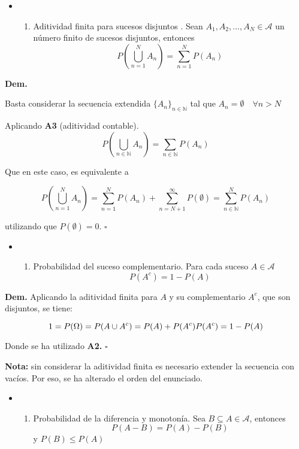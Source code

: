 \begin{itemize}
\item
  \begin{enumerate}
  \def\labelenumi{\alph{enumi})}
  \setcounter{enumi}{1}
  \tightlist
  \item
    Aditividad finita para sucesos disjuntos . Sean
    \(A_1, A_2, \dots, A_N \in \mathcal{A}\) un número finito de sucesos
    disjuntos, entonces \[
    P\left(\bigcup_{n=1}^N A_n \right) = \sum_{n=1}^N P(A_n)
    \]
  \end{enumerate}
\end{itemize}

\textbf{Dem.}

Basta considerar la secuencia extendida \(\{A_n\}_{n \in \mathbb{N}}\)
tal que \(A_n = \emptyset \quad \forall n > N\)

Aplicando \textbf{A3} (aditividad contable). \[
P\left(\bigcup_{n \in \mathbb{N}} A_n \right) = \sum_{n \in \mathbb{N}} P(A_n)
\]

Que en este caso, es equivalente a

\[
P\left(\bigcup_{n=1}^N A_n\right) = \sum_{n=1}^N P(A_n) + \sum_{n=N+1}^\infty P(\emptyset) =  \sum_{n \in \mathbb{N}}^N P(A_n)
\]

utilizando que \(P(\emptyset) = 0.\) \(\square\)

\begin{itemize}
\item
  \begin{enumerate}
  \def\labelenumi{\alph{enumi})}
  \setcounter{enumi}{2}
  \tightlist
  \item
    Probabilidad del suceso complementario. Para cada suceso
    \(A \in \mathcal{A}\) \[
    P(A^c) = 1 - P(A)
    \]
  \end{enumerate}
\end{itemize}

\textbf{Dem.} Aplicando la aditividad finita para \(A\) y su
complementario \(A^c\), que son disjuntos, se tiene:

\[
1 = P(\Omega) = P(A \cup A^c) = P(A) + P(A^c) \\
P(A^c) = 1 - P(A)
\]

Donde se ha utilizado \textbf{A2.} \(\square\)

\textbf{Nota:} sin considerar la aditividad finita es necesario extender
la secuencia con vacíos. Por eso, se ha alterado el orden del enunciado.

\begin{itemize}
\item
  \begin{enumerate}
  \def\labelenumi{\alph{enumi})}
  \setcounter{enumi}{3}
  \tightlist
  \item
    Probabilidad de la diferencia y monotonía. Sea
    \(B \subseteq A \in \mathcal{A}\), entonces \[
    P(A −B) = P(A) −P(B)
    \] y \(P(B) \leq P(A)\)
  \end{enumerate}
\end{itemize}

